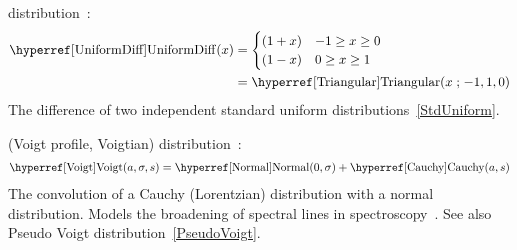\secbreak
{} distribution~\cite{Springer1979a}:
\begin{align}
\label{UniformDiff}
\opr{UniformDiff}(x) \checked & = 
\begin{cases}
(1+x) & -1\geq x \geq 0 \\
(1-x) & 0\geq x \geq 1
\end{cases}
\\ \notag & = \opr{Triangular}(x\given -1,1,0) \checked
\end{align}
The difference of two independent standard uniform distributions~\eqref{StdUniform}.





\secbreak
{} (Voigt profile, Voigtian) distribution~\cite{Armstrong1967}:
\begin{align}
\label{Voigt}
\opr{Voigt}(a,\sigma,s) = \opr{Normal}(0,\sigma) + \opr{Cauchy}(a,s) \checked
\end{align}
The convolution of a Cauchy (Lorentzian) distribution with a normal distribution. Models the broadening of spectral lines in spectroscopy~\cite{Armstrong1967}. See also Pseudo Voigt distribution~\eqref{PseudoVoigt}.



